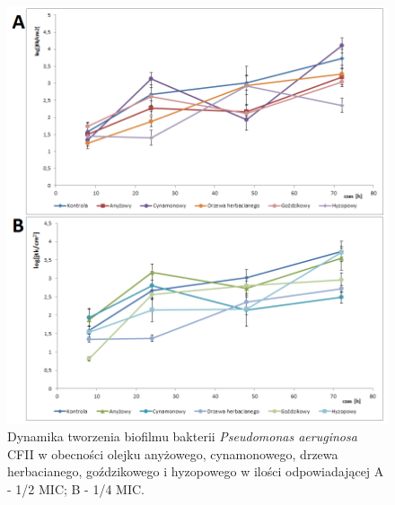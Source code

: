 \documentclass[11pt,a4paper]{report}
\begin{document}
\begin{figure}[!h]
\begin{center}
\includegraphics[scale=0.67]{img/cfii-a.png}
\caption{Dynamika tworzenia biofilmu bakterii \textit{Pseudomonas aeruginosa} CFII w obecności olejku anyżowego, cynamonowego, drzewa herbacianego, goździkowego i hyzopowego w ilości odpowiadającej A - 1/2 MIC; B - 1/4 MIC.}\label{cfii-a}
\end{center} 
\end{figure}
\end{document}
